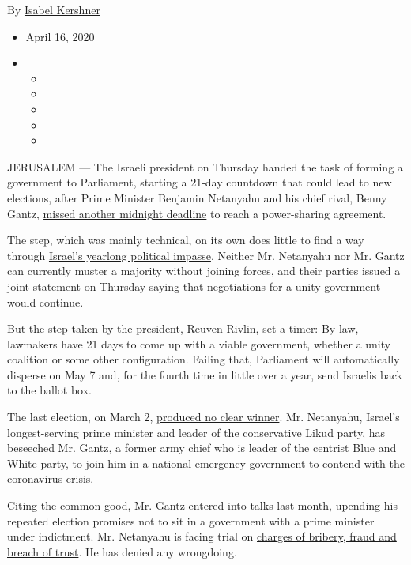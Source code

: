 By \href{https://www.nytimes3xbfgragh.onion/by/isabel-kershner}{Isabel
Kershner}

\begin{itemize}
\item
  April 16, 2020
\item
  \begin{itemize}
  \item
  \item
  \item
  \item
  \item
  \end{itemize}
\end{itemize}

JERUSALEM --- The Israeli president on Thursday handed the task of
forming a government to Parliament, starting a 21-day countdown that
could lead to new elections, after Prime Minister Benjamin Netanyahu and
his chief rival, Benny Gantz,
\href{https://www.nytimes3xbfgragh.onion/2020/04/14/world/middleeast/israel-coronavirus-netanyahu-gantz.html}{missed
another midnight deadline} to reach a power-sharing agreement.

The step, which was mainly technical, on its own does little to find a
way through
\href{https://www.nytimes3xbfgragh.onion/2019/09/23/world/middleeast/israel-election-rivlin-netanyahu-gantz.html}{Israel's
yearlong political impasse}. Neither Mr. Netanyahu nor Mr. Gantz can
currently muster a majority without joining forces, and their parties
issued a joint statement on Thursday saying that negotiations for a
unity government would continue.

But the step taken by the president, Reuven Rivlin, set a timer: By law,
lawmakers have 21 days to come up with a viable government, whether a
unity coalition or some other configuration. Failing that, Parliament
will automatically disperse on May 7 and, for the fourth time in little
over a year, send Israelis back to the ballot box.

The last election, on March 2,
\href{https://www.nytimes3xbfgragh.onion/2020/03/03/world/middleeast/israel-election-takeaways.html}{produced
no clear winner}. Mr. Netanyahu, Israel's longest-serving prime minister
and leader of the conservative Likud party, has beseeched Mr. Gantz, a
former army chief who is leader of the centrist Blue and White party, to
join him in a national emergency government to contend with the
coronavirus crisis.

Citing the common good, Mr. Gantz entered into talks last month,
upending his repeated election promises not to sit in a government with
a prime minister under indictment. Mr. Netanyahu is facing trial on
\href{https://www.nytimes3xbfgragh.onion/2019/11/21/world/middleeast/netanyahu-corruption-indicted.html}{charges
of bribery, fraud and breach of trust}. He has denied any wrongdoing.

